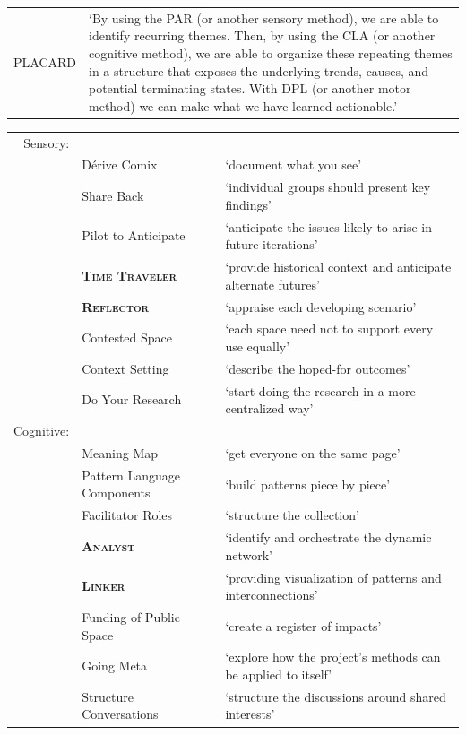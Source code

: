 \documentclass[acmlarge,timestamp]{acmart}
\begin{document}
\clearpage
\begin{table}[p]
\hspace{-1em}\begin{tabular}{rp{}}
    PLACARD & ‘By using the PAR (or another sensory method), we are
    able to identify recurring themes.  Then, by using the CLA (or
    another cognitive method), we are able to organize these repeating
    themes in a structure that exposes the underlying trends, causes,
    and potential terminating states. With DPL (or another motor
    method) we can make what we have learned actionable.’ \cite{patterns-of-patterns-i}
\end{tabular}
  \begin{tabular}{rll}
Sensory: &&\\
&{\sc Dérive Comix}& ‘document what you see’ \\
&{\sc Share Back}& ‘individual groups should present key findings’\\
&{\sc Pilot to Anticipate}& ‘anticipate the issues likely to arise in future iterations’\\
&{\bfseries\scshape Time Traveler }& ‘provide historical context and
anticipate alternate futures’\\
&{\bfseries\scshape Reflector}& ‘appraise each developing scenario’\\
&{\sc Contested Space}& ‘each space need not to support every use equally’ \\
&{\sc Context Setting}& ‘describe the hoped-for outcomes’\\
&{\sc Do Your Research}& ‘start doing the research in a more centralized way’\\
Cognitive: && \\
&{\sc Meaning Map }& ‘get everyone on the same page’\\
&{\sc Pattern Language Components }& ‘build patterns piece by piece’\\
&{\sc Facilitator Roles}& ‘structure the collection’\\
&{\bfseries\scshape Analyst }& ‘identify and orchestrate the dynamic network’ \\
& {\bfseries\scshape Linker}& ‘providing visualization of patterns and interconnections’ \\
&{\sc Funding of Public Space}& ‘create a register of impacts’\\
&{\sc Going Meta}& ‘explore how the project’s methods can be applied to
itself’\\
&{\sc Structure Conversations}& ‘structure the discussions around shared interests’\\

\end{tabular}
\end{table}
\end{document}
